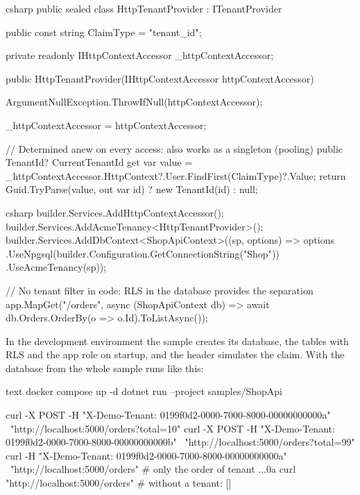 \begin{sourcecode}{csharp}
public sealed class HttpTenantProvider : ITenantProvider
{
    public const string ClaimType = "tenant_id";

    private readonly IHttpContextAccessor _httpContextAccessor;

    public HttpTenantProvider(IHttpContextAccessor httpContextAccessor)
    {
        ArgumentNullException.ThrowIfNull(httpContextAccessor);

        _httpContextAccessor = httpContextAccessor;
    }

    // Determined anew on every access: also works as a singleton (pooling)
    public TenantId? CurrentTenantId
    {
        get
        {
            var value = _httpContextAccessor.HttpContext?.User.FindFirst(ClaimType)?.Value;
            return Guid.TryParse(value, out var id) ? new TenantId(id) : null;
        }
    }
}
\end{sourcecode}

\begin{sourcecode}{csharp}
builder.Services.AddHttpContextAccessor();
builder.Services.AddAcmeTenancy<HttpTenantProvider>();
builder.Services.AddDbContext<ShopApiContext>((sp, options) => options
    .UseNpgsql(builder.Configuration.GetConnectionString("Shop"))
    .UseAcmeTenancy(sp));

// No tenant filter in code: RLS in the database provides the separation
app.MapGet("/orders", async (ShopApiContext db) =>
    await db.Orders.OrderBy(o => o.Id).ToListAsync());
\end{sourcecode}

In the development environment the sample creates its database, the tables with RLS and the
app role on startup, and the header  simulates
the claim. With the database from  the whole sample runs
like this:

\begin{sourcecode}[Shell]{text}
docker compose up -d
dotnet run --project samples/ShopApi

curl -X POST -H "X-Demo-Tenant: 0199f0d2-0000-7000-8000-00000000000a" \
    "http://localhost:5000/orders?total=10"
curl -X POST -H "X-Demo-Tenant: 0199f0d2-0000-7000-8000-00000000000b" \
    "http://localhost:5000/orders?total=99"
curl -H "X-Demo-Tenant: 0199f0d2-0000-7000-8000-00000000000a" \
    "http://localhost:5000/orders"        # only the order of tenant ...0a
curl "http://localhost:5000/orders"       # without a tenant: []
\end{sourcecode}

